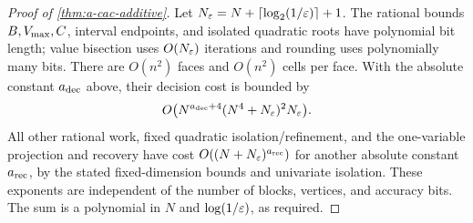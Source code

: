 \begin{proof}[Proof of \cref{thm:a-cac-additive}]
Let $N_\varepsilon=N+\lceil\log_2(1/\varepsilon)\rceil+1$. The rational
bounds $B,V_{\max},C$, interval endpoints, and isolated quadratic roots have
polynomial bit length; value bisection uses $O(N_\varepsilon)$ iterations and
rounding uses polynomially many bits. There are $O(n^2)$ faces and
$O(n^2)$ cells per face. With the absolute constant $a_{\rm dec}$ above, their
decision cost is bounded by
\[
 O\bigl(N^{a_{\rm dec}+4}(N^4+N_\varepsilon)^2N_\varepsilon\bigr).
\]
All other rational work, fixed quadratic isolation/refinement, and the
one-variable projection and recovery have cost $O((N+N_\varepsilon)^{a_{\rm rec}})$ for
another absolute constant $a_{\rm rec}$, by the stated fixed-dimension bounds
and univariate isolation. These exponents are independent of the
number of blocks, vertices, and accuracy bits. The sum is a polynomial
in $N$ and $\log(1/\varepsilon)$, as required.
\end{proof}


